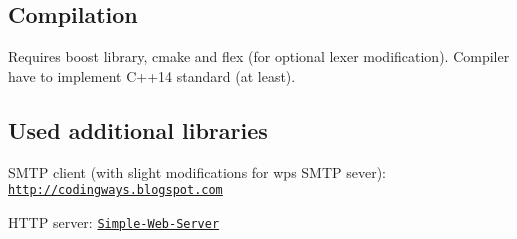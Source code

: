 \subsection*{Compilation}

Requires {\ttfamily boost} library, {\ttfamily cmake} and {\ttfamily flex} (for optional lexer modification). Compiler have to implement C++14 standard (at least).




\subsection*{Used additional libraries}


\begin{DoxyEnumerate}
\item S\+M\+TP client (with slight modifications for wp\textquotesingle{}s S\+M\+TP sever)\+: \href{http://codingways.blogspot.com/2012/08/send-email-in-c-smtp-client-in-c.html}{\tt http\+://codingways.\+blogspot.\+com}
\item H\+T\+TP server\+: \href{https://github.com/eidheim/Simple-Web-Server}{\tt Simple-\/\+Web-\/\+Server} 
\end{DoxyEnumerate}